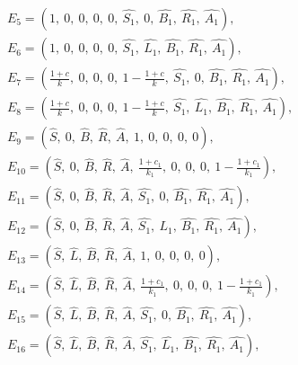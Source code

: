 \begin{align}
& E_{5} = \left( 1, \ 0, \ 0, \ 0, \ 0, \ \hat{S_1},\ 0,\ \hat{B_1},\ \hat{R_1},\ \hat{A_1} \right) \label{eq:E5},\\

& E_{6} = \left( 1, \ 0, \ 0, \ 0, \ 0, \ \hat{S_1},\ \hat{L_1},\ \hat{B_1},\ \hat{R_1},\ \hat{A_1} \right) \label{eq:E6},\\

& E_{7} = \left( \frac{1+c}{k},\ 0,\ 0,\ 0,\ 1- \frac{1+c}{k},\ \hat{S_1},\ 0,\ \hat{B_1},\ \hat{R_1},\ \hat{A_1} \right)\label{eq:E7},\\

& E_{8} = \left( \frac{1+c}{k},\ 0,\ 0,\ 0,\ 1- \frac{1+c}{k}, \ \hat{S_1},\ \hat{L_1},\ \hat{B_1},\ \hat{R_1},\ \hat{A_1} \right)\label{eq:E8},\\

& E_{9} = \left( \hat{S}, \ 0,\ \hat{B},\ \hat{R},\ \hat{A}, \ 1, \ 0, \ 0, \ 0, \ 0 \right) \label{eq:E9},\\

& E_{10} = \left( \hat{S}, \ 0,\ \hat{B},\ \hat{R},\ \hat{A}, \ \frac{1+c_1}{k_1}, \ 0, \ 0, \ 0, \ 1- \frac{1+c_1}{k_1} \right) \label{eq:E10},\\

& E_{11} = \left( \hat{S}, \ 0,\ \hat{B},\ \hat{R},\ \hat{A},\ \hat{S_1},\ 0,\ \hat{B_1},\ \hat{R_1},\ \hat{A_1} \right) \label{eq:E11},\\

& E_{12} = \left( \hat{S}, \ 0,\ \hat{B},\ \hat{R},\ \hat{A},\ \hat{S_1},\ \hat{L_1},\ \hat{B_1},\ \hat{R_1},\ \hat{A_1} \right) \label{eq:E12},\\

& E_{13} = \left( \hat{S}, \ \hat{L},\ \hat{B},\ \hat{R},\ \hat{A}, \ 1, \ 0, \ 0, \ 0, \ 0\right) \label{eq:E13},\\

& E_{14} = \left( \hat{S}, \ \hat{L},\ \hat{B},\ \hat{R},\ \hat{A},  \ \frac{1+c_1}{k_1}, \ 0, \ 0, \ 0, \ 1- \frac{1+c_1}{k_1}\right) \label{eq:E14},\\

& E_{15} = \left( \hat{S}, \ \hat{L},\ \hat{B},\ \hat{R},\ \hat{A}, \ \hat{S_1},\ 0,\ \hat{B_1},\ \hat{R_1},\ \hat{A_1} \right) \label{eq:E15},\\

& E_{16} = \left( \hat{S}, \ \hat{L},\ \hat{B},\ \hat{R},\ \hat{A}, \ \hat{S_1},\ \hat{L_1} ,\ \hat{B_1},\ \hat{R_1},\ \hat{A_1} \right) \label{eq:E16},\\

\end{align}

